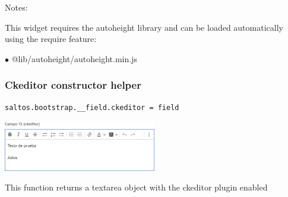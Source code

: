 \documentclass[a4paper]{article}
\begin{document}
Notes:

This widget requires the autoheight library and can be loaded automatically using the require
feature:

\begin{compactitem}
\item[\color{myblue}$\bullet$] @lib/autoheight/autoheight.min.js
\end{compactitem}

\hypertarget{toc59}{}
\subsubsection{Ckeditor constructor helper}

\begin{lstlisting}
saltos.bootstrap.__field.ckeditor = field
\end{lstlisting}

\begin{center}\includegraphics[width=0.5\textwidth]{../ujest/snaps/test-bootstrap-js-bootstrap-campo-13-ckeditor-1-snap.png}\end{center}

This function returns a textarea object with the ckeditor plugin enabled
\end{document}
